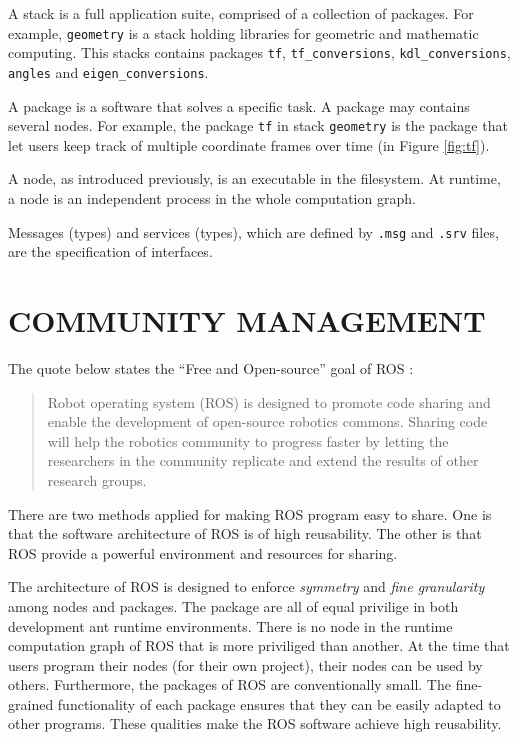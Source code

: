 \documentclass[a4paper, 10pt, conference]{ieeeconf}       %
\begin{document}
A stack is a full application suite, comprised of a collection of packages. For example, \texttt{geometry} is a stack holding libraries for geometric and mathematic computing. This stacks contains packages \texttt{tf}, \texttt{tf\_conversions}, \texttt{kdl\_conversions}, \texttt{angles} and \texttt{eigen\_conversions}.

A package is a software that solves a specific task. A package may contains several nodes. For example, the package \texttt{tf} in stack \texttt{geometry} is the package that let users keep track of multiple coordinate frames over time (in Figure \ref{fig:tf}).
  
A node, as introduced previously, is an executable in the filesystem. At runtime, a node is an independent process in the whole computation graph.

Messages (types) and services (types), which are defined by \texttt{.msg} and \texttt{.srv} files, are the specification of interfaces.

\section{COMMUNITY MANAGEMENT}

The quote below states the ``Free and Open-source'' goal of ROS\cite{cousins_sharing_2010} :
\begin{quote}
  Robot operating system (ROS) is designed to promote code sharing and enable the development of open-source robotics commons. Sharing code will help the robotics community to progress faster by letting the researchers in the community replicate and extend the results of other research groups. 
\end{quote}

There are two methods applied for making ROS program easy to share. One is that the software architecture of ROS is of high reusability. The other is that ROS provide a powerful environment and resources for sharing.

The architecture of ROS is designed to enforce \emph{symmetry} and \emph{fine granularity} among nodes and packages. The package are all of equal privilige in both development ant runtime environments. There is no node in the runtime computation graph of ROS that is more priviliged than another. At the time that users program their nodes (for their own project), their nodes can be used by others. Furthermore, the packages of ROS are conventionally small. The fine-grained functionality of each package ensures that they can be easily adapted to other programs. These qualities make the ROS software achieve high reusability.
\end{document}
